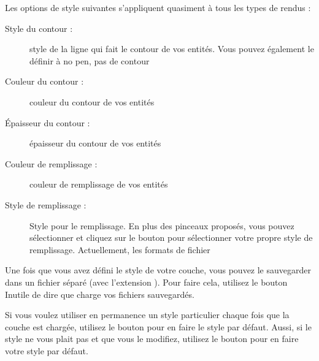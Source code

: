 Les options de style suivantes s'appliquent quasiment à tous les types de rendus :
\begin{description}
\item[Style du contour :] style de la ligne qui fait le contour de vos entités. Vous pouvez également le définir à \og no pen\fg, pas de contour
\item[Couleur du contour :] couleur du contour de vos entités
\item[Épaisseur du contour :] épaisseur du contour de vos entités
\item[Couleur de remplissage :] couleur de remplissage de vos entités
\item[Style de remplissage :] Style pour le remplissage. En plus des pinceaux proposés, vous pouvez sélectionner  et cliquez sur le \browsebutton bouton pour sélectionner votre propre style de remplissage. Actuellement, les formats de fichier 
\end{description}

Une fois que vous avez défini le style de votre couche, vous pouvez le sauvegarder dans un fichier séparé (avec l'extension ). Pour faire cela, utilisez le bouton  Inutile de dire que  charge vos fichiers sauvegardés.

Si vous voulez utiliser en permanence un style particulier chaque fois que la couche est chargée, utilisez le bouton  pour en faire le style par défaut. Aussi, si le style ne vous plait pas et que vous le modifiez, utilisez le bouton  pour en faire votre style par défaut.

